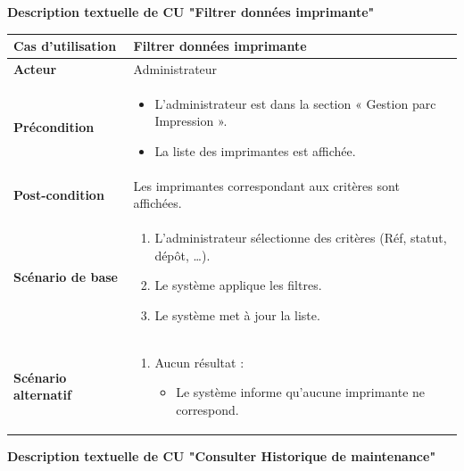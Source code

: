 \documentclass[a4paper,11pt]{report}
\begin{document}
\newpage
\textbf{Description textuelle de CU "Filtrer données imprimante"}

\begin{tabularx}{\textwidth}{|>{\bfseries}l|X|}
\hline
Cas d’utilisation    & Filtrer données imprimante \\
\hline
Acteur               & Administrateur \\
\hline
Précondition         &
\begin{itemize}[left=0pt]
  \item L'administrateur est dans la section « Gestion parc Impression ».
  \item La liste des imprimantes est affichée.
\end{itemize} \\
\hline
Post-condition       & Les imprimantes correspondant aux critères sont affichées. \\
\hline
Scénario de base     &
\begin{enumerate}[left=0pt]
  \item L’administrateur sélectionne des critères (Réf, statut, dépôt, …).
  \item Le système applique les filtres.
  \item Le système met à jour la liste.
\end{enumerate} \\
\hline
Scénario alternatif   &
\begin{enumerate}[label=\arabic*.a,wide=0pt]
  \item[3.a] Aucun résultat :
    \begin{itemize}[left=1em]
      \item Le système informe qu’aucune imprimante ne correspond.
    \end{itemize}
\end{enumerate} \\
\hline
\end{tabularx}


\newpage
\textbf{Description textuelle de CU "Consulter Historique de maintenance"}
\end{document}
